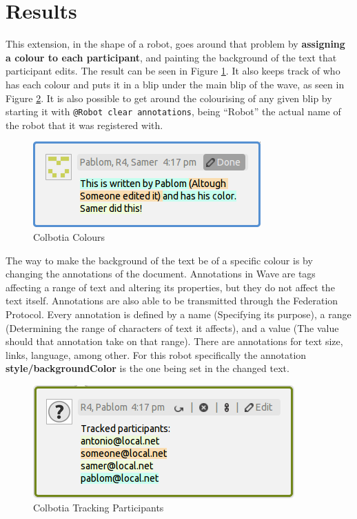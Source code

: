 \section{Results}
This extension, in the shape of a robot, goes around that problem by \textbf{assigning a colour to each participant}, and painting the background of the text that participant edits. The result can be seen in Figure \ref{fig:colorizer_editions}. It also keeps track of who has each colour and puts it in a blip under the main blip of the wave, as seen in Figure \ref{fig:colorizer_editors}. It is also possible to get around the colourising of any given blip by starting it with \verb|@Robot clear annotations|, being ``Robot'' the actual name of the robot that it was registered with.
\begin{figure}[H]
  \center
    \includegraphics[keepaspectratio, scale=0.8]{Media/Captures/Extensions/Colorizer/ColorizerEditions.png}
  \caption{Colbotia Colours}
  \label{fig:colorizer_editions}
\end{figure}
The way to make the background of the text be of a specific colour is by changing the annotations of the document. Annotations in Wave are tags affecting a range of text and altering its properties, but they do not affect the text itself. Annotations are also able to be transmitted through the Federation Protocol. Every annotation is defined by a name (Specifying its purpose), a range (Determining the range of characters of text it affects), and a value (The value should that annotation take on that range). There are annotations for text size, links, language, among other. For this robot specifically the annotation \textbf{style/backgroundColor} is the one being set in the changed text.\\[.2cm]
\begin{figure}[H]
  \center
    \includegraphics[keepaspectratio, scale=0.7]{Media/Captures/Extensions/Colorizer/ColorizerEditors.png}
  \caption{Colbotia Tracking Participants}
  \label{fig:colorizer_editors}
\end{figure}
